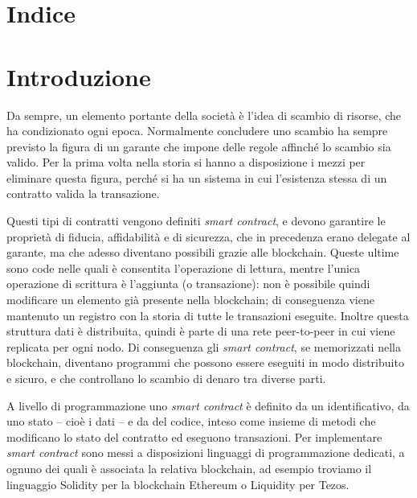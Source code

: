 \documentclass[]{article}
\date{}
\begin{document}
\hypertarget{indice}{%
\section{Indice}\label{indice}}

\hypertarget{introduzione}{%
\section{Introduzione}\label{introduzione}}

Da sempre, un elemento portante della società è l'idea di scambio di
risorse, che ha condizionato ogni epoca. Normalmente concludere uno
scambio ha sempre previsto la figura di un garante che impone delle
regole affinché lo scambio sia valido. Per la prima volta nella storia
si hanno a disposizione i mezzi per eliminare questa figura, perché si
ha un sistema in cui l'esistenza stessa di un contratto valida la
transazione.

Questi tipi di contratti vengono definiti \emph{smart contract}, e
devono garantire le proprietà di fiducia, affidabilità e di sicurezza,
che in precedenza erano delegate al garante, ma che adesso diventano
possibili grazie alle blockchain. Queste ultime sono code nelle quali è
consentita l'operazione di lettura, mentre l'unica operazione di
scrittura è l'aggiunta (o transazione): non è possibile quindi
modificare un elemento già presente nella blockchain; di conseguenza
viene mantenuto un registro con la storia di tutte le transazioni
eseguite. Inoltre questa struttura dati è distribuita, quindi è parte di
una rete peer-to-peer in cui viene replicata per ogni nodo. Di
conseguenza gli \emph{smart contract}, se memorizzati nella blockchain,
diventano programmi che possono essere eseguiti in modo distribuito e
sicuro, e che controllano lo scambio di denaro tra diverse parti.

A livello di programmazione uno \emph{smart contract} è definito da un
identificativo, da uno stato -- cioè i dati -- e da del codice, inteso
come insieme di metodi che modificano lo stato del contratto ed eseguono
transazioni. Per implementare \emph{smart contract} sono messi a
disposizioni linguaggi di programmazione dedicati, a ognuno dei quali è
associata la relativa blockchain, ad esempio troviamo il linguaggio
Solidity per la blockchain Ethereum o Liquidity per Tezos.
\end{document}
